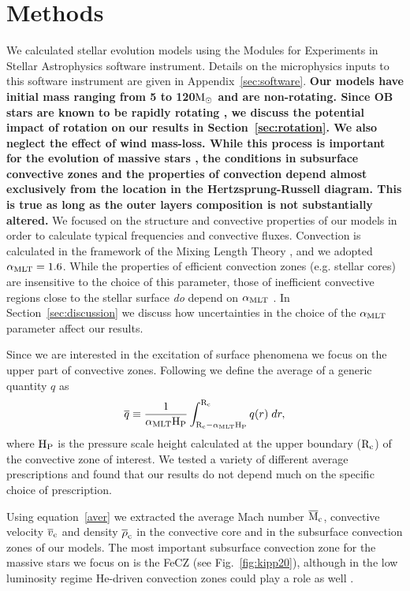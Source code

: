 \documentclass[twocolumn]{aastex63}
\begin{document}
\section{Methods}
We calculated stellar evolution models using the Modules for Experiments in Stellar Astrophysics
\citep[MESA][]{Paxton2011, Paxton2013, Paxton2015, Paxton2018, Paxton2019} software instrument.
Details on the microphysics inputs to this software instrument are given in Appendix~\ref{sec:software}. 
{\bf Our models have initial mass ranging from 5 to 120${\rm M}_\odot$ and are non-rotating. Since OB stars are known to be rapidly rotating \citep[e.g.][]{Maeder:2000,Dufton:2013,Ramirez:2013}, we discuss the potential impact of rotation on our results in Section~\ref{sec:rotation}. We also neglect the effect of wind mass-loss. While this process is important for the evolution of massive stars \citep{Smith:2014}, the conditions in  subsurface convective zones and the properties of convection depend almost exclusively from the location in the Hertzsprung-Russell diagram.  This is true as long as the outer layers composition is not substantially altered.}
We focused on the structure and convective properties of our models in order to calculate typical frequencies and convective fluxes. 
Convection is calculated in the framework of the Mixing Length Theory \citep[][MLT hereafter]{1958ZA.....46..108B}, and we adopted $\alpha_{\rm MLT} = 1.6$. While the properties of efficient convection zones (e.g. stellar cores) are insensitive to the choice of this parameter, those of inefficient convective regions close to the stellar surface \emph{do} depend on $\alpha_{\rm MLT}$ \citep{2015ApJ...813...74J,Cantiello:2019}. In Section~\ref{sec:discussion} we discuss how uncertainties in the choice of the $\alpha_{\rm MLT}$  parameter affect our results. 

Since we are interested in the excitation of surface phenomena we focus on the upper part of convective zones.
Following \citet{Cantiello:2009}  we define the average of a generic quantity $q$ as
\begin{equation}
\overline{q} \equiv \frac{1}{\alpha_{\rm MLT} \mathrm{H}_{\mathrm{P}}} \int_{\mathrm{R}_{\mathrm{c}}-\alpha_{\rm MLT}\mathrm{H}_{\mathrm{P}}}^{\mathrm{R}_{\mathrm{c}}} q(r)\; dr,
\label{aver}
\end{equation}
where  $\mathrm{H}_{\mathrm{P}}$ is the pressure scale height calculated at the upper boundary ($\mathrm{R}_{\mathrm{c}}$) of the 
convective zone of interest.  We tested a variety of different average prescriptions and found that our results do not depend much on the specific choice of prescription.  

Using equation~\eqref{aver} we extracted the average Mach number $\overline{\rm M}_{\rm c}$, convective velocity $\overline{v}_{\rm c}$ and density $\overline{\rho}_{\rm c}$ in the convective core and in the subsurface convection zones of our models.
The most important subsurface convection zone for the massive stars we focus on is the FeCZ (see Fig.~\ref{fig:kipp20}), although in the low luminosity regime He-driven convection zones could play a role as well \citep{Cantiello:2009,Cantiello:2019}. 
\end{document}
